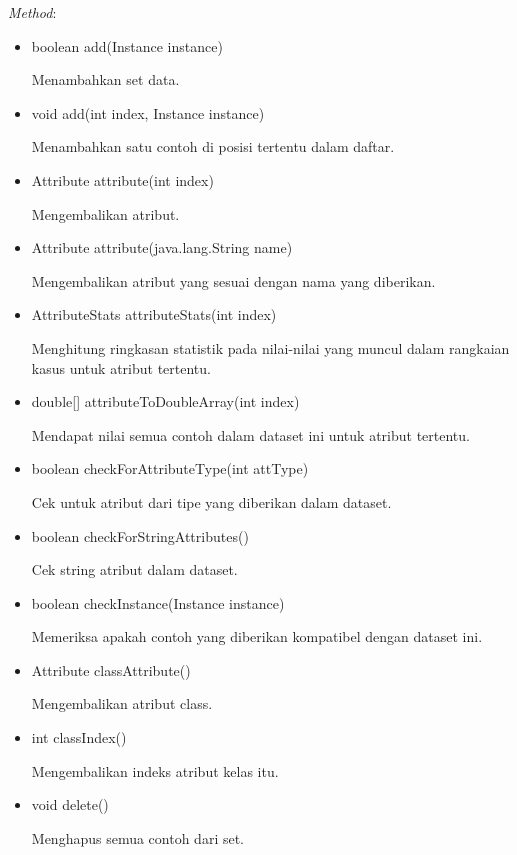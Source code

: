 \textsl{Method}:
\begin{itemize}
	\item boolean add(Instance instance)
	
	Menambahkan set data.
	
	\item void add(int index, Instance instance)
	
	Menambahkan satu contoh di posisi tertentu dalam daftar.
	
	\item Attribute attribute(int index)
	
	Mengembalikan atribut.
	
	\item Attribute attribute(java.lang.String name)
	
	Mengembalikan atribut yang sesuai dengan nama yang diberikan.
	
	\item AttributeStats attributeStats(int index)
	
	Menghitung ringkasan statistik pada nilai-nilai yang muncul dalam rangkaian kasus untuk atribut tertentu.
	
	\item double[] attributeToDoubleArray(int index)
	
	Mendapat nilai semua contoh dalam dataset ini untuk atribut tertentu.
	
	\item boolean checkForAttributeType(int attType)
	
	Cek untuk atribut dari tipe yang diberikan dalam dataset.
	
	\item boolean checkForStringAttributes()
	
	Cek string atribut dalam dataset.
	
	\item boolean checkInstance(Instance instance)
	
	Memeriksa apakah contoh yang diberikan kompatibel dengan dataset ini.
	
	\item Attribute classAttribute()
	
	Mengembalikan atribut class.
	
	\item int classIndex()
	
	Mengembalikan indeks atribut kelas itu.
	
	\item void delete()
	
	Menghapus semua contoh dari set.
	

\end{itemize}
